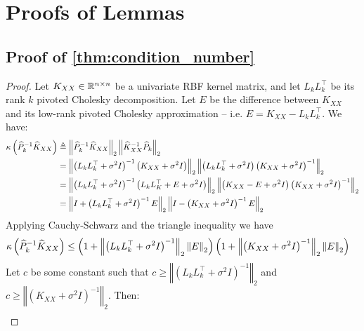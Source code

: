 \section{Proofs of Lemmas}
\label{sec:proofs}

\subsection{Proof of \autoref{thm:condition_number}}

\begin{proof}
  Let $K_{XX} \in \mathbb{R}^{n \times n}$ be a univariate RBF kernel matrix, and let $L_{k} L_k^\top$ be its rank $k$ pivoted Cholesky decomposition.
  Let $E$ be the difference between $K_{XX}$ and its low-rank pivoted Cholesky approximation -- i.e. $E = K_{XX} - L_k L_k^\top$.
  We have:
  \begin{align*}
    \kappa \left( \widehat{P}_{k}^{-1}\widehat{K}_{XX} \right)
    &\triangleq \left\Vert \widehat{P}_{k}^{-1}\widehat{K}_{XX} \right\Vert_{2} \left\Vert \widehat{K}_{XX}^{-1}\widehat{P}_{k} \right\Vert_{2}
    \\
    &= \left\Vert \left( L_k L_k^\top + \sigma^2 I \right)^{-1} \left(K_{XX} + \sigma^2 I \right) \right\Vert_{2}
    \left\Vert \left( L_k L_k^\top + \sigma^2 I \right) \left(K_{XX} + \sigma^2 I \right)^{-1} \right\Vert_{2}
    \\
    &= \left\Vert \left( L_k L_k^\top + \sigma^2 I \right)^{-1} \left(L_k L_K^\top + E + \sigma^2 I \right) \right\Vert_{2}
    \left\Vert \left( K_{XX} - E + \sigma^2 I \right) \left(K_{XX} + \sigma^2 I \right)^{-1} \right\Vert_{2}
    \\
    &= \left\Vert I + \left( L_k L_k^\top + \sigma^2 I \right)^{-1} E \right\Vert_{2}
    \left\Vert I - \left(K_{XX} + \sigma^2 I \right)^{-1} E \right\Vert_{2}
  \end{align*}
  Applying Cauchy-Schwarz and the triangle inequality we have
  \begin{align*}
    \kappa \left( \widehat{P}_{k}^{-1}\widehat{K}_{XX} \right)
    &\leq \left( 1 + \left\Vert \left( L_k L_k^\top + \sigma^2 I \right)^{-1} \right\Vert_2 \left\Vert E \right\Vert_{2} \right)
      \left( 1 + \left\Vert \left( K_{XX} + \sigma^2 I \right)^{-1} \right\Vert_2 \left\Vert E \right\Vert_{2} \right)
  \end{align*}
  Let $c$ be some constant such that $c \geq \left\Vert \left( L_k L_k^\top + \sigma^2 I \right)^{-1} \right\Vert_{2}$
  and $c \geq \left\Vert \left( K_{XX} + \sigma^2 I \right)^{-1} \right\Vert_{2}$. Then:
  \begin{align*}

\end{align*}
\end{proof}
